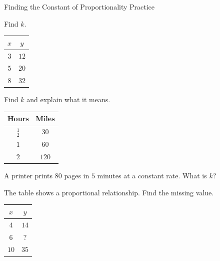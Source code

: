 \begin{stepPractice}{Finding the Constant of Proportionality Practice}
    \resetProblems

    \prob Find $k$.
    \begin{center}
    \begin{tabular}{|c|c|}
    \hline $x$ & $y$ \\ \hline $3$ & $12$ \\ $5$ & $20$ \\ $8$ & $32$ \\ \hline
    \end{tabular}
    \end{center}

    \prob Find $k$ and explain what it means.
    \begin{center}
    \begin{tabular}{|c|c|}
    \hline \textbf{Hours} & \textbf{Miles} \\ \hline $\frac{1}{2}$ & $30$ \\ $1$ & $60$ \\ $2$ & $120$ \\ \hline
    \end{tabular}
    \end{center}

    \prob A printer prints $80$ pages in $5$ minutes at a constant rate. What is $k$? \answerBlank[2.5cm]

    \prob The table shows a proportional relationship. Find the missing value.
    \begin{center}
    \begin{tabular}{|c|c|}
    \hline $x$ & $y$ \\ \hline $4$ & $14$ \\ $6$ & $?$ \\ $10$ & $35$ \\ \hline
    \end{tabular}
    \end{center}

\end{stepPractice}
